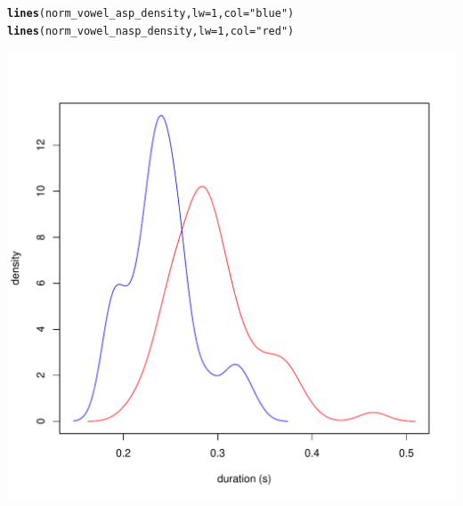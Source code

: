 \documentclass[a4paper,11pt]{article}\usepackage[]{graphicx}\usepackage[]{color}
\makeatletter
\def\maxwidth{ %
  \ifdim\Gin@nat@width>\linewidth
    \linewidth
  \else
    \Gin@nat@width
  \fi
}
\newcommand{\hlnum}[1]{\textcolor[rgb]{0.686,0.059,0.569}{#1}}%
\newcommand{\hlstr}[1]{\textcolor[rgb]{0.192,0.494,0.8}{#1}}%
\newcommand{\hlstd}[1]{\textcolor[rgb]{0.345,0.345,0.345}{#1}}%
\newcommand{\hlkwc}[1]{\textcolor[rgb]{0.333,0.667,0.333}{#1}}%
\newcommand{\hlkwd}[1]{\textcolor[rgb]{0.737,0.353,0.396}{\textbf{#1}}}%
\newenvironment{kframe}{%
 \def\at@end@of@kframe{}%
 \ifinner\ifhmode%
  \def\at@end@of@kframe{\end{minipage}}%
  \begin{minipage}{\columnwidth}%
 \fi\fi%
 \def\FrameCommand##1{\hskip\@totalleftmargin \hskip-\fboxsep
 \colorbox{shadecolor}{##1}\hskip-\fboxsep
     \hskip-\linewidth \hskip-\@totalleftmargin \hskip\columnwidth}%
 \MakeFramed {\advance\hsize-\width
   \@totalleftmargin\z@ \linewidth\hsize
   \@setminipage}}%
 {\par\unskip\endMakeFramed%
 \at@end@of@kframe}
\newenvironment{knitrout}{}{} %
\makeatother
\begin{document}
\begin{knitrout}
\begin{kframe}
\begin{alltt}
\hlkwd{lines}\hlstd{(norm_vowel_asp_density,} \hlkwc{lw} \hlstd{=} \hlnum{1}\hlstd{,} \hlkwc{col} \hlstd{=} \hlstr{"blue"}\hlstd{)}
\hlkwd{lines}\hlstd{(norm_vowel_nasp_density,} \hlkwc{lw} \hlstd{=} \hlnum{1}\hlstd{,} \hlkwc{col} \hlstd{=} \hlstr{"red"}\hlstd{)}
\end{alltt}
\end{kframe}
\includegraphics[width=\maxwidth]{img/bi-nas-dens-1} 

\end{knitrout}
\end{document}
